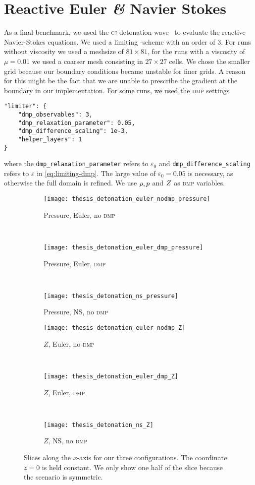 \section{Reactive Euler \textit{\&} Navier Stokes}\label{sec:results-reactive}
As a final benchmark, we used the \textsc{cj}-detonation wave~ to evaluate the reactive Navier-Stokes equations.
We used a limiting \aderdg{}-scheme with an order of 3.
For runs without viscosity we used a meshsize of $81 \times 81$, for the runs with a viscosity of $\mu = 0.01$ we used a coarser mesh consisting in $27 \times 27$ cells.
We chose the smaller grid because our boundary conditions became unstable for finer grids.
A reason for this might be the fact that we are unable to prescribe the gradient at the boundary in our \muscl{} implementation.
For some runs, we used the \textsc{dmp} settings
\begin{verbatim}
"limiter": {
    "dmp_observables": 3,
    "dmp_relaxation_parameter": 0.05,
    "dmp_difference_scaling": 1e-3,
    "helper_layers": 1
}
\end{verbatim}
where the \texttt{dmp\_relaxation\_parameter} refers to $\varepsilon_0$ and \texttt{dmp\_difference\_scaling} refers to $\varepsilon$ in \cref{eq:limiting-dmp}.
The large value of $\varepsilon_0 = 0.05$ is necessary, as otherwise the full domain is refined.
We use $\rho, p$ and $Z$ as \textsc{dmp} variables.
\begin{figure}[tb]
  \centering
  \begin{subfigure}[t]{0.3\textwidth}
    \centering
    \texttt{[image: thesis\_detonation\_euler\_nodmp\_pressure]}
    \caption{Pressure, Euler, no \textsc{dmp}}
  \end{subfigure}~%
  \begin{subfigure}[t]{0.3\textwidth}
    \centering
    \texttt{[image: thesis\_detonation\_euler\_dmp\_pressure]}
    \caption{Pressure, Euler, \textsc{dmp}}
  \end{subfigure}~%
  \begin{subfigure}[t]{0.3\textwidth}
    \centering
    \texttt{[image: thesis\_detonation\_ns\_pressure]}
    \caption{Pressure, \textsc{NS}, no \textsc{dmp}}
  \end{subfigure}

  \begin{subfigure}[t]{0.3\textwidth}
    \centering
    \texttt{[image: thesis\_detonation\_euler\_nodmp\_Z]}
    \caption{$Z$, Euler, no \textsc{dmp}}
  \end{subfigure}~%
  \begin{subfigure}[t]{0.3\textwidth}
    \centering
    \texttt{[image: thesis\_detonation\_euler\_dmp\_Z]}
    \caption{$Z$, Euler, \textsc{dmp}}
  \end{subfigure}~%
  \begin{subfigure}[t]{0.3\textwidth}
    \centering
    \texttt{[image: thesis\_detonation\_ns\_Z]}
    \caption{$Z$, \textsc{NS}, no \textsc{dmp}}
  \end{subfigure}
  \caption{\label{fig:detonation-line-plots}%
    Slices along the $x$-axis for our three configurations.
    The coordinate $z = 0$ is held constant.
    We only show one half of the slice because the scenario is symmetric.
  }
\end{figure}
